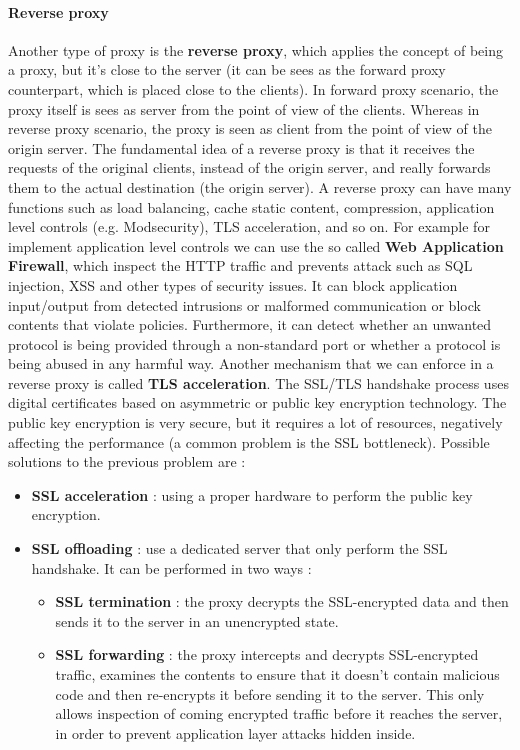 \documentclass[11pt]{article}
\begin{document}
\paragraph{Reverse proxy} Another type of proxy is the \textbf{reverse proxy}, which applies the concept of being a proxy, but it's close to the server (it can be sees as the forward proxy counterpart, which is placed close to the clients). In forward proxy scenario, the proxy itself is sees as server from the point of view of the clients. Whereas in reverse proxy scenario, the proxy is seen as client from the point of view of the origin server. The fundamental idea of a reverse proxy is that it receives the requests of the original clients, instead of the origin server, and really forwards them to the actual destination (the origin server). A reverse proxy can have many functions such as load balancing, cache static content, compression, application level controls (e.g. Modsecurity), TLS acceleration, and so on. For example for implement application level controls we can use the so called \textbf{Web Application Firewall}, which inspect the HTTP traffic and prevents attack such as SQL injection, XSS and other types of security issues. It can block application input/output from detected intrusions or malformed communication or block contents that violate policies. Furthermore, it can detect whether an unwanted protocol is being provided through a non-standard port or whether a protocol is being abused in any harmful way. Another mechanism that we can enforce in a reverse proxy is called \textbf{TLS acceleration}. The SSL/TLS handshake process uses digital certificates based on asymmetric or public key encryption technology. The public key encryption is very secure, but it requires a lot of resources, negatively affecting the performance (a common problem is the SSL bottleneck). Possible solutions to the previous problem are : 
\begin{itemize}
\item \textbf{SSL acceleration} : using a proper hardware to perform the public key encryption.
\item \textbf{SSL offloading} : use a dedicated server that only perform the SSL handshake. It can be performed in two ways : 
\begin{itemize}
\item \textbf{SSL termination} : the proxy decrypts the SSL-encrypted data and then sends it to the server in an unencrypted state.
\item \textbf{SSL forwarding} : the proxy intercepts and decrypts SSL-encrypted traffic, examines the contents to ensure that it doesn't contain malicious code and then re-encrypts it before sending it to the server. This only allows inspection of coming encrypted traffic before it reaches the server, in order to prevent application layer attacks hidden inside.
\end{itemize}
\end{itemize}
\end{document}
